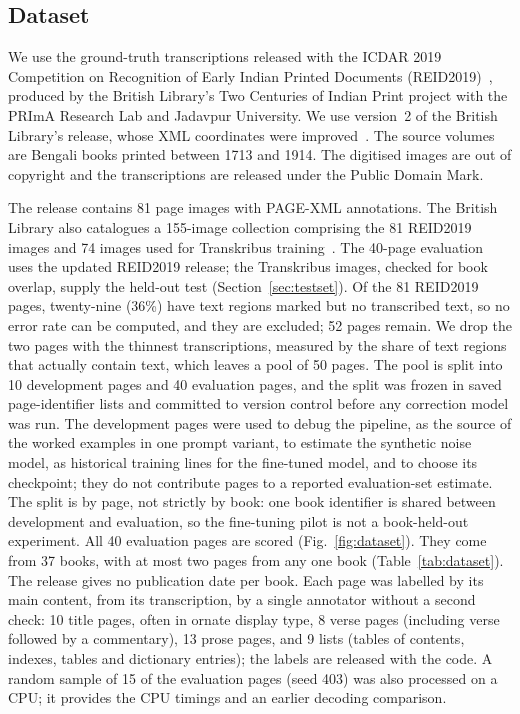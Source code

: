 \documentclass[conference]{IEEEtran}
\begin{document}
\subsection{Dataset}
We use the ground-truth transcriptions released with the ICDAR 2019 Competition on Recognition of Early Indian Printed Documents (REID2019)~\cite{clausner2019reid}, produced by the British Library's Two Centuries of Indian Print project with the PRImA Research Lab and Jadavpur University. We use version~2 of the British Library's release, whose XML coordinates were improved~\cite{britishlibrary2019bengaligt}. The source volumes are Bengali books printed between 1713 and 1914. The digitised images are out of copyright and the transcriptions are released under the Public Domain Mark.

The release contains 81 page images with PAGE-XML annotations. The British Library also catalogues a 155-image collection comprising the 81 REID2019 images and 74 images used for Transkribus training~\cite{britishlibraryBengaliCollection}. The 40-page evaluation uses the updated REID2019 release; the Transkribus images, checked for book overlap, supply the held-out test (Section~\ref{sec:testset}). Of the 81 REID2019 pages, twenty-nine (36\%) have text regions marked but no transcribed text, so no error rate can be computed, and they are excluded; 52 pages remain. We drop the two pages with the thinnest transcriptions, measured by the share of text regions that actually contain text, which leaves a pool of 50 pages. The pool is split into 10 development pages and 40 evaluation pages, and the split was frozen in saved page-identifier lists and committed to version control before any correction model was run. The development pages were used to debug the pipeline, as the source of the worked examples in one prompt variant, to estimate the synthetic noise model, as historical training lines for the fine-tuned model, and to choose its checkpoint; they do not contribute pages to a reported evaluation-set estimate. The split is by page, not strictly by book: one book identifier is shared between development and evaluation, so the fine-tuning pilot is not a book-held-out experiment. All 40 evaluation pages are scored (Fig.~\ref{fig:dataset}). They come from 37 books, with at most two pages from any one book (Table~\ref{tab:dataset}). The release gives no publication date per book. Each page was labelled by its main content, from its transcription, by a single annotator without a second check: 10 title pages, often in ornate display type, 8 verse pages (including verse followed by a commentary), 13 prose pages, and 9 lists (tables of contents, indexes, tables and dictionary entries); the labels are released with the code. A random sample of 15 of the evaluation pages (seed 403) was also processed on a CPU; it provides the CPU timings and an earlier decoding comparison.
\end{document}
